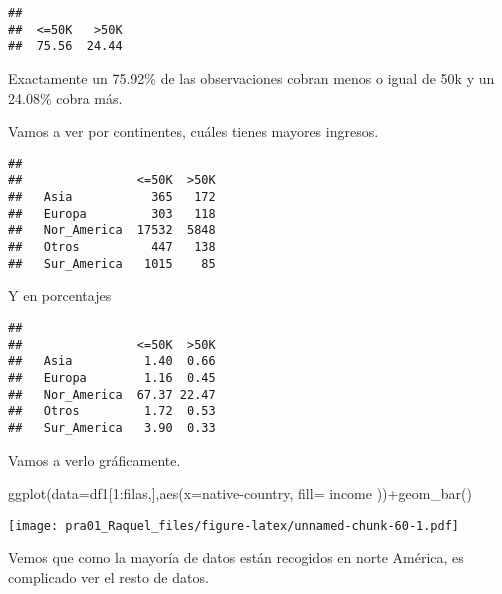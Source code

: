 \documentclass[]{article}
\newenvironment{Shaded}{\begin{snugshade}}{\end{snugshade}}
\newcommand{\DataTypeTok}[1]{\textcolor[rgb]{0.87,0.87,0.75}{#1}}
\newcommand{\DecValTok}[1]{\textcolor[rgb]{0.86,0.86,0.80}{#1}}
\newcommand{\KeywordTok}[1]{\textcolor[rgb]{0.94,0.87,0.69}{#1}}
\newcommand{\NormalTok}[1]{\textcolor[rgb]{0.80,0.80,0.80}{#1}}
\newcommand{\OperatorTok}[1]{\textcolor[rgb]{0.94,0.94,0.82}{#1}}
\newcommand{\StringTok}[1]{\textcolor[rgb]{0.80,0.58,0.58}{#1}}
\begin{document}
\begin{verbatim}
## 
##  <=50K   >50K 
##  75.56  24.44
\end{verbatim}

Exactamente un 75.92\% de las observaciones cobran menos o igual de 50k
y un 24.08\% cobra más.

Vamos a ver por continentes, cuáles tienes mayores ingresos.

\begin{Shaded}
\end{Shaded}

\begin{verbatim}
##              
##                <=50K  >50K
##   Asia           365   172
##   Europa         303   118
##   Nor_America  17532  5848
##   Otros          447   138
##   Sur_America   1015    85
\end{verbatim}

Y en porcentajes

\begin{Shaded}
\end{Shaded}

\begin{verbatim}
##              
##                <=50K  >50K
##   Asia          1.40  0.66
##   Europa        1.16  0.45
##   Nor_America  67.37 22.47
##   Otros         1.72  0.53
##   Sur_America   3.90  0.33
\end{verbatim}

Vamos a verlo gráficamente.

\begin{Shaded}
\begin{Highlighting}[]
\KeywordTok{ggplot}\NormalTok{(}\DataTypeTok{data=}\NormalTok{df1[}\DecValTok{1}\OperatorTok{:}\NormalTok{filas,],}\KeywordTok{aes}\NormalTok{(}\DataTypeTok{x=}\StringTok{\textasciigrave{}}\DataTypeTok{native{-}country}\StringTok{\textasciigrave{}}\NormalTok{, }\DataTypeTok{fill=}\NormalTok{ income ))}\OperatorTok{+}\KeywordTok{geom\_bar}\NormalTok{()}
\end{Highlighting}
\end{Shaded}

\texttt{[image: pra01\_Raquel\_files/figure-latex/unnamed-chunk-60-1.pdf]}

Vemos que como la mayoría de datos están recogidos en norte América, es
complicado ver el resto de datos.
\end{document}
